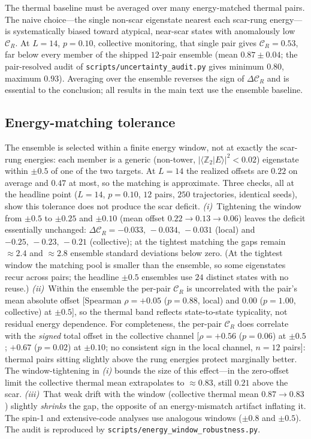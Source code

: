 \documentclass[aps,prb,twocolumn]{revtex4-2}
\newcommand{\CR}{\mathcal{C}_R}
\newcommand{\Ztwo}{\mathbb{Z}_2}
\begin{document}
The thermal baseline must be averaged over many energy-matched thermal pairs.
The naive choice---the single non-scar eigenstate nearest each scar-rung
energy---is systematically biased toward atypical, near-scar states with
anomalously low $\CR$. At $L=14$, $p=0.10$, collective monitoring, that single
pair gives $\CR=0.53$, far below every member of the shipped $12$-pair
ensemble (mean $0.87\pm0.04$; the pair-resolved audit of
\texttt{scripts/uncertainty\_audit.py} gives minimum $0.80$, maximum
$0.93$). Averaging over the
ensemble reverses the sign of $\Delta\CR$ and is essential to the conclusion;
all results in the main text use the ensemble baseline.

\subsection{Energy-matching tolerance}
The ensemble is selected within a finite energy window, not at exactly the
scar-rung energies: each member is a generic (non-tower,
$|\langle\Ztwo|E\rangle|^2<0.02$) eigenstate within $\pm0.5$ of one of the two
targets. At $L=14$ the realized offsets are $0.22$ on average and $0.47$ at
most, so the matching is approximate. Three checks, all at the headline point
($L{=}14$, $p{=}0.10$, $12$ pairs, $250$ trajectories, identical seeds), show
this tolerance does not produce the scar deficit. \emph{(i)}~Tightening the
window from $\pm0.5$ to $\pm0.25$ and $\pm0.10$ (mean offset
$0.22\to0.13\to0.06$) leaves the deficit essentially unchanged:
$\Delta\CR=-0.033,\,-0.034,\,-0.031$ (local) and $-0.25,\,-0.23,\,-0.21$
(collective); at the tightest matching the gaps remain $\approx2.4$ and
$\approx2.8$ ensemble standard deviations below zero. (At the tightest
window the matching pool is smaller than the ensemble, so some eigenstates
recur across pairs; the headline $\pm0.5$ ensembles use $24$ distinct states
with no reuse.) \emph{(ii)}~Within the
ensemble the per-pair $\CR$ is uncorrelated with the pair's mean absolute
offset [Spearman $\rho=+0.05$ ($p=0.88$, local) and $0.00$ ($p=1.00$,
collective) at $\pm0.5$], so the thermal band reflects state-to-state
typicality, not residual energy dependence. For completeness, the per-pair
$\CR$ does correlate with the \emph{signed} total offset in the collective
channel [$\rho=+0.56$ ($p=0.06$) at $\pm0.5$; $+0.67$ ($p=0.02$) at
$\pm0.10$; no consistent sign in the local channel, $n=12$ pairs]: thermal
pairs sitting slightly above the rung energies protect marginally better.
The window-tightening in \emph{(i)} bounds the size of this effect---in the
zero-offset limit the collective thermal mean extrapolates to
$\approx0.83$, still $0.21$ above the scar. \emph{(iii)}~That weak drift with
the window (collective thermal mean $0.87\to0.83$) slightly \emph{shrinks} the
gap, the opposite of an energy-mismatch artifact inflating it. The spin-1 and
extensive-code analyses use analogous windows ($\pm0.8$ and $\pm0.5$). The
audit is reproduced by \texttt{scripts/energy\_window\_robustness.py}.
\end{document}
